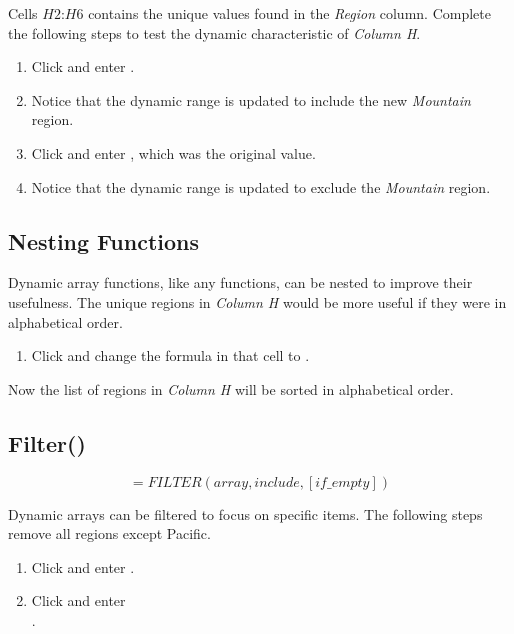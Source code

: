 Cells $ H2 $:$ H6 $ contains the unique values found in the \textit{Region} column. Complete the following steps to test the dynamic characteristic of \textit{Column H}.

\begin{enumbox}
	\begin{enumerate}
		\item Click  and enter .
		\item Notice that the dynamic range  is updated to include the new \textit{Mountain} region. 
		\item Click  and enter , which was the original value.
		\item Notice that the dynamic range  is updated to exclude the \textit{Mountain} region.		
	\end{enumerate}
\end{enumbox}

\subsection{Nesting Functions}

Dynamic array functions, like any functions, can be nested to improve their usefulness. The unique regions in \textit{Column H} would be more useful if they were in alphabetical order.

\begin{enumbox}
	\begin{enumerate}
		\item Click  and change the formula in that cell to .
	\end{enumerate}
\end{enumbox}

Now the list of regions in \textit{Column H} will be sorted in alphabetical order.

\subsection{Filter()}

\[ =FILTER(array,include,[if\_empty]) \]

Dynamic arrays can be filtered to focus on specific items. The following steps remove all regions except Pacific.

\begin{enumbox}
	\begin{enumerate}
		\item Click  and enter .
		\item Click  and enter\\ . 
	\end{enumerate}
\end{enumbox}

